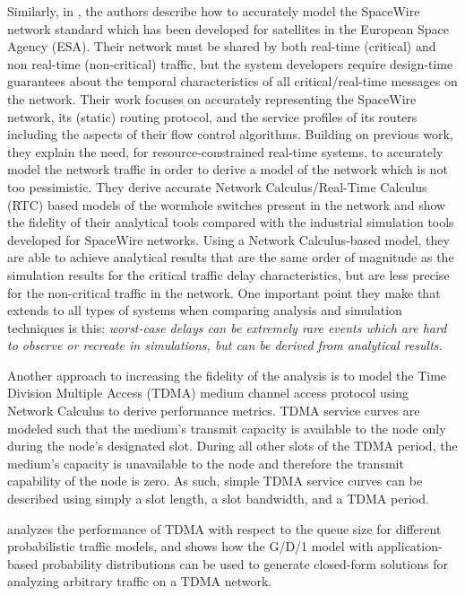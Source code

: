 Similarly, in \cite{NCspacewire}, the authors describe how to
accurately model the SpaceWire network standard which has been
developed for satellites in the European Space Agency (ESA).  Their
network must be shared by both real-time (critical) and non real-time
(non-critical) traffic, but the system developers require design-time
guarantees about the temporal characteristics of all
critical/real-time messages on the network.  Their work focuses on
accurately representing the SpaceWire network, its (static) routing
protocol, and the service profiles of its routers including the
aspects of their flow control algorithms.  Building on previous work,
they explain the need, for resource-constrained real-time systems, to
accurately model the network traffic in order to derive a model of the
network which is not too pessimistic.  They derive accurate Network
Calculus/Real-Time Calculus (RTC) based models of the wormhole
switches present in the network and show the fidelity of their
analytical tools compared with the industrial simulation tools
developed for SpaceWire networks.  Using a Network Calculus-based
model, they are able to achieve analytical results that are the same
order of magnitude as the simulation results for the critical traffic
delay characteristics, but are less precise for the non-critical
traffic in the network.  One important point they make that extends to
all types of systems when comparing analysis and simulation techniques
is this: \textit{worst-case delays can be extremely rare events which
are hard to observe or recreate in simulations, but can be derived
from analytical results.}\cite{NCspacewire}

Another approach to increasing the fidelity of the analysis is to
model the Time Division Multiple Access (TDMA) medium channel access
protocol using Network Calculus to derive performance
metrics\cite{Schmitt2007}.  TDMA service curves are modeled such that
the medium's transmit capacity is available to the node only during
the node's designated slot.  During all other slots of the TDMA
period, the medium's capacity is unavailable to the node and therefore
the transmit capability of the node is zero.  As such, simple TDMA
service curves can be described using simply a slot length, a slot
bandwidth, and a TDMA period.

\cite{TDMA_Khan_98} analyzes the performance of TDMA with respect to
the queue size for different probabilistic traffic models, and shows
how the G/D/1 model with application-based probability distributions
can be used to generate closed-form solutions for analyzing arbitrary
traffic on a TDMA network.

